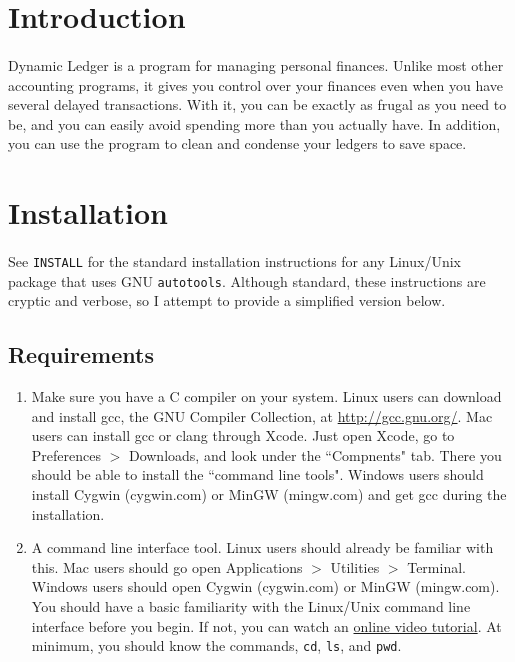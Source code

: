 \documentclass{article}
\begin{document}
\begin{flushleft}

\section{Introduction}

\paragraph{} Dynamic Ledger is a program for managing personal finances. Unlike most other accounting programs, it gives you control over your finances even when you have several delayed transactions. With it, you can be exactly as frugal as you need to be, and you can easily avoid spending more than you actually have. In addition, you can use the program to clean and condense your ledgers to save space.

\section{Installation}

\paragraph{} See {\tt INSTALL} for the standard installation instructions for any Linux/Unix package that uses GNU {\tt autotools}. Although standard, these instructions are cryptic and verbose, so I attempt to provide a simplified version below. 

\subsection{Requirements}
\begin{enumerate}
\item Make sure you have a C compiler on your system. Linux users can download and install gcc, the GNU Compiler Collection, at \url{http://gcc.gnu.org/}. Mac users can install gcc or clang through Xcode. Just open Xcode, go to Preferences $>$ Downloads, and look under the ``Compnents" tab. There you should be able to install the ``command line tools". Windows users should install Cygwin (cygwin.com) or MinGW (mingw.com) and get gcc during the installation.
\item A command line interface tool. Linux users should already be familiar with this. Mac users should go open Applications $>$ Utilities $>$ Terminal. Windows users should open Cygwin (cygwin.com) or MinGW (mingw.com). You should have a basic familiarity with the Linux/Unix command line interface before you begin. If not, you can watch an \href{http://www.youtube.com/watch?v=2FiQSLdnBqA}{online video tutorial}. At minimum, you should know the commands, {\tt cd}, {\tt ls}, and {\tt pwd}.
\end{enumerate}



\end{flushleft}
\end{document}
